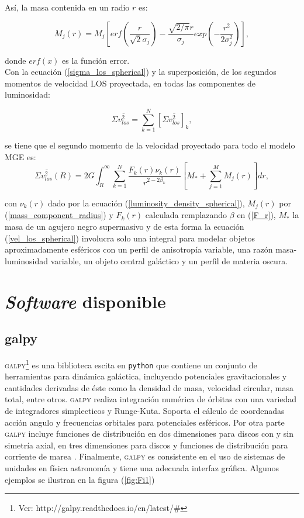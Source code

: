 Así, la masa contenida en un radio $r$ es:

\begin{equation}
\label{mass_component_radius}
M_j (r) = M_j \left[ erf \left( \frac{r}{\sqrt{2}\sigma_j } \right) -\frac{ \sqrt{2/\pi} r }{\sigma_j } exp \left( -\frac{r^2}{2\sigma_j^2} \right)   \right],
\end{equation}

donde $erf (x)$ es la función error. \\

Con la ecuación (\ref{sigma_los_spherical}) y la superposición, de los segundos momentos de velocidad LOS proyectada, en todas las componentes de luminosidad:

$$ \Sigma \overline{v_{los}^2} = \sum_{k=1}^N \left[ \Sigma \overline{v_{los}^2} \right]_k, $$

se tiene que el segundo momento de la velocidad proyectado para todo el modelo MGE es:
\begin{equation}
\label{vel_los_spherical}
\Sigma \overline{v_{los}^2} (R) = 2G \int_R^{\infty} \sum_{k=1}^N \frac{F_k(r) \nu_k(r) }{ r^{2-2\beta_k} }  \left[ M_* + \sum_{j=1}^M M_j(r) \right] dr,
\end{equation}

con $\nu_k (r)$ dado por la ecuación (\ref{luminosity_density_spherical}), $M_j(r)$ por (\ref{mass_component_radius}) y $F_k(r)$ calculada remplazando $\beta$ en (\ref{F_r}), $M_*$ la masa de un agujero negro supermasivo y de esta forma la ecuación (\ref{vel_los_spherical}) involucra solo una integral para modelar objetos aproximadamente esféricos con un perfil de anisotropía variable, una razón masa-luminosidad variable, un objeto central galáctico y un perfil de materia oscura.




\section{\emph{Software} disponible}

\subsection{galpy}

\textsc{galpy}\footnote{Ver: http://galpy.readthedocs.io/en/latest/\#} es una biblioteca escita en \verb+python+ que contiene un conjunto de herramientas para dinámica galáctica, incluyendo potenciales gravitacionales y cantidades derivadas de éste como la densidad de masa, velocidad circular, masa total, entre otros. \textsc{galpy} realiza integración numérica de órbitas con una variedad de integradores simplecticos y Runge-Kuta. Soporta el cálculo de coordenadas acción angulo y frecuencias orbitales para potenciales esféricos. Por otra parte \textsc{galpy} incluye funciones de distribución en dos dimensiones para discos con y sin simetría axial, en tres dimensiones para discos y funciones de distribución para corriente de marea \cite{B15}. Finalmente, \textsc{galpy} es consistente en el uso de sistemas de unidades en física astronomía y tiene una adecuada interfaz gráfica. Algunos ejemplos se ilustran en la figura (\ref{fig:Fi1})


